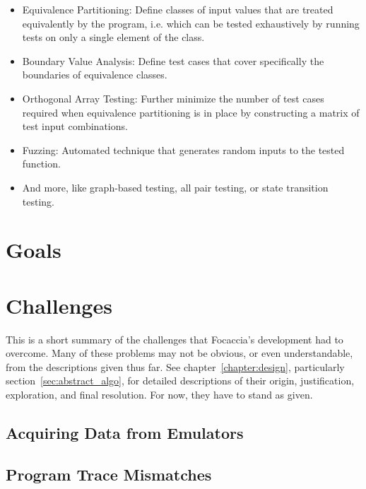 \begin{itemize}
    \item Equivalence Partitioning: Define classes of input values that are treated equivalently by the program, i.e.
        which can be tested exhaustively by running tests on only a single element of the class.
    \item Boundary Value Analysis: Define test cases that cover specifically the boundaries of equivalence classes.
    \item Orthogonal Array Testing: Further minimize the number of test cases required when equivalence partitioning is
        in place by constructing a matrix of test input combinations.
    \item Fuzzing: Automated technique that generates random inputs to the tested function.
    \item And more, like graph-based testing, all pair testing, or state transition testing.
\end{itemize}

\section{Goals}

\section{Challenges}

This is a short summary of the challenges that Focaccia's development had to overcome. Many of these problems may not be
obvious, or even understandable, from the descriptions given thus far. See chapter~\ref{chapter:design}, particularly
section~\ref{sec:abstract_algo}, for detailed descriptions of their origin, justification, exploration, and final
resolution. For now, they have to stand as given.

\subsection{Acquiring Data from Emulators}

\subsection{Program Trace Mismatches}
